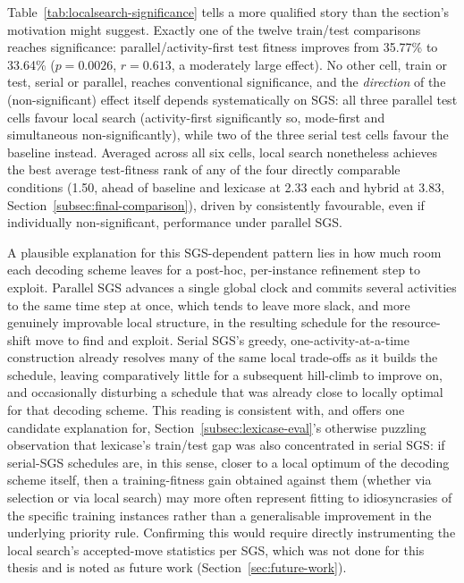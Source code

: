 Table~\ref{tab:localsearch-significance} tells a more qualified story than
the section's motivation might suggest. Exactly one of the twelve
train/test comparisons reaches significance: parallel/activity-first test
fitness improves from 35.77\% to 33.64\% ($p=0.0026$, $r=0.613$, a
moderately large effect). No other cell, train or test, serial or parallel,
reaches conventional significance, and the \emph{direction} of the
(non-significant) effect itself depends systematically on SGS: all three
parallel test cells favour local search (activity-first significantly so,
mode-first and simultaneous non-significantly), while two of the three
serial test cells favour the baseline instead. Averaged across all six
cells, local search nonetheless achieves the best average test-fitness rank
of any of the four directly comparable conditions (1.50, ahead of baseline
and lexicase at 2.33 each and hybrid at 3.83,
Section~\ref{subsec:final-comparison}), driven by consistently
favourable, even if individually non-significant, performance under
parallel SGS.

A plausible explanation for this SGS-dependent pattern lies in how much
room each decoding scheme leaves for a post-hoc, per-instance refinement
step to exploit. Parallel SGS advances a single global clock and commits
several activities to the same time step at once, which tends to leave more
slack, and more genuinely improvable local structure, in the resulting
schedule for the resource-shift move to find and exploit. Serial SGS's
greedy, one-activity-at-a-time construction already resolves many of the
same local trade-offs as it builds the schedule, leaving comparatively
little for a subsequent hill-climb to improve on, and occasionally
disturbing a schedule that was already close to locally optimal for that
decoding scheme. This reading is consistent with, and offers one candidate
explanation for, Section~\ref{subsec:lexicase-eval}'s otherwise puzzling
observation that lexicase's train/test gap was also concentrated in serial
SGS: if serial-SGS schedules are, in this sense, closer to a local optimum
of the decoding scheme itself, then a training-fitness gain obtained
against them (whether via selection or via local search) may more often
represent fitting to idiosyncrasies of the specific training instances
rather than a generalisable improvement in the underlying priority rule.
Confirming this would require directly instrumenting the local search's
accepted-move statistics per SGS, which was not done for this thesis and is
noted as future work (Section~\ref{sec:future-work}).


